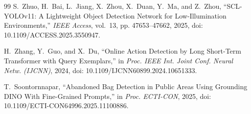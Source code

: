 \documentclass[12pt,a4paper]{report}
\begin{document}
\begin{thebibliography}{99}
S.~Zhuo, H.~Bai, L.~Jiang, X.~Zhou, X.~Duan, Y.~Ma, and Z.~Zhou, ``SCL-YOLOv11: A Lightweight Object Detection Network for Low-Illumination Environments,'' \emph{IEEE Access}, vol.~13, pp. 47653--47662, 2025, doi: 10.1109/ACCESS.2025.3550947.

H.~Zhang, Y.~Guo, and X.~Du, ``Online Action Detection by Long Short-Term Transformer with Query Exemplars,'' in \emph{Proc. IEEE Int. Joint Conf. Neural Netw. (IJCNN)}, 2024, doi: 10.1109/IJCNN60899.2024.10651333.

T.~Soontornnapar, ``Abandoned Bag Detection in Public Areas Using Grounding DINO With Fine-Grained Prompts,'' in \emph{Proc. ECTI-CON}, 2025, doi: 10.1109/ECTI-CON64996.2025.11100886.

\end{thebibliography}
\end{document}
